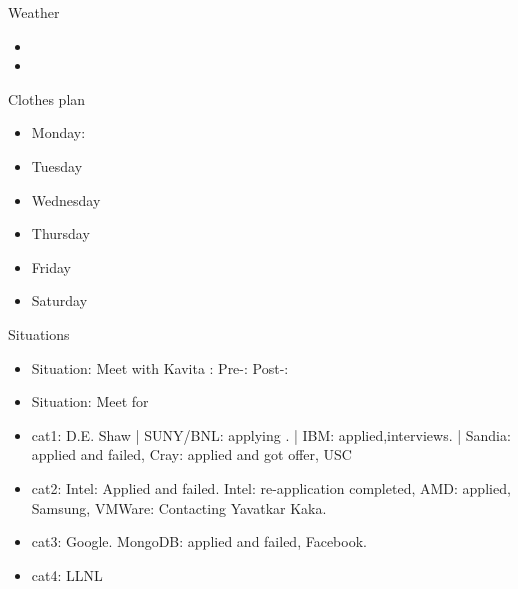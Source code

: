 \documentclass[serif, mathserif, final]{beamer}
\begin{document}
\begin{frame}
\begin{columns}
\begin{column}{0.25\linewidth}
  \begin{block}{Weather}
    \begin{itemize}
      \tiny \item \tiny 
    \item \tiny
    \end{itemize}
  \end{block}
  
  \begin{block}{Clothes plan} 
    \begin{itemize}
      \tiny \item \tiny Monday: 
    \item \tiny Tuesday
    \item \tiny Wednesday
    \item \tiny Thursday
    \item \tiny Friday
    \item \tiny Saturday
    \end{itemize} 
  \end{block}

      \begin{block}{Situations}
        \begin{itemize}
        \item \tiny Situation: Meet with Kavita : Pre-: Post-: 
        \item \tiny Situation: Meet for 
        \end{itemize} 
      \end{block} 



\begin{block}
\begin{itemize}
\tiny \item \tiny cat1: 
D.E. Shaw | SUNY/BNL: applying . | IBM: applied,interviews.  | Sandia:
applied and failed, Cray: applied and got offer, USC
\item \tiny cat2:
     Intel: Applied and failed. Intel: re-application completed, AMD:
     applied, Samsung, VMWare: Contacting Yavatkar Kaka. 
\item \tiny cat3:
Google. MongoDB: applied and failed, Facebook. 
\item \tiny cat4: LLNL 
\end{itemize} 
\end{block} 



\end{column}
\end{columns}
\end{frame}
\end{document}
